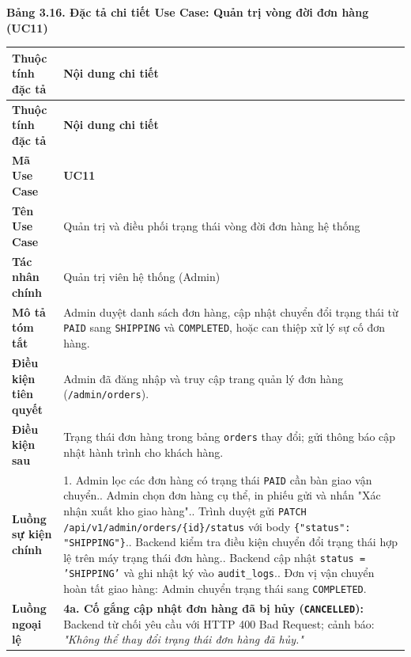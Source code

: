 \documentclass[11pt, a4paper]{report}
\begin{document}
\vspace{0.3cm}
\noindent\textbf{Bảng 3.16. Đặc tả chi tiết Use Case: Quản trị vòng đời đơn hàng (UC11)}

\begin{longtable}{p{3.8cm} p{10.5cm}}
\toprule
\textbf{Thuộc tính đặc tả} & \textbf{Nội dung chi tiết} \\
\midrule
\endfirsthead
\toprule
\textbf{Thuộc tính đặc tả} & \textbf{Nội dung chi tiết} \\
\midrule
\endhead
\bottomrule
\endfoot
\textbf{Mã Use Case} & \textbf{UC11} \\
\midrule
\textbf{Tên Use Case} & Quản trị và điều phối trạng thái vòng đời đơn hàng hệ thống \\
\midrule
\textbf{Tác nhân chính} & Quản trị viên hệ thống (Admin) \\
\midrule
\textbf{Mô tả tóm tắt} & Admin duyệt danh sách đơn hàng, cập nhật chuyển đổi trạng thái từ \texttt{PAID} sang \texttt{SHIPPING} và \texttt{COMPLETED}, hoặc can thiệp xử lý sự cố đơn hàng. \\
\midrule
\textbf{Điều kiện tiên quyết} & Admin đã đăng nhập và truy cập trang quản lý đơn hàng (\texttt{/admin/orders}). \\
\midrule
\textbf{Điều kiện sau} & Trạng thái đơn hàng trong bảng \texttt{orders} thay đổi; gửi thông báo cập nhật hành trình cho khách hàng. \\
\midrule
\textbf{Luồng sự kiện chính} & 
1. Admin lọc các đơn hàng có trạng thái \texttt{PAID} cần bàn giao vận chuyển.\newline
2. Admin chọn đơn hàng cụ thể, in phiếu gửi và nhấn "Xác nhận xuất kho giao hàng".\newline
3. Trình duyệt gửi \texttt{PATCH /api/v1/admin/orders/\{id\}/status} với body \texttt{\{"status": "SHIPPING"\}}.\newline
4. Backend kiểm tra điều kiện chuyển đổi trạng thái hợp lệ trên máy trạng thái đơn hàng.\newline
5. Backend cập nhật \texttt{status = 'SHIPPING'} và ghi nhật ký vào \texttt{audit\_logs}.\newline
6. Đơn vị vận chuyển hoàn tất giao hàng: Admin chuyển trạng thái sang \texttt{COMPLETED}. \\
\midrule
\textbf{Luồng ngoại lệ} & 
\textbf{4a. Cố gắng cập nhật đơn hàng đã bị hủy (\texttt{CANCELLED}):} Backend từ chối yêu cầu với HTTP 400 Bad Request; cảnh báo: \textit{"Không thể thay đổi trạng thái đơn hàng đã hủy."} \\
\bottomrule
\end{longtable}
\end{document}
